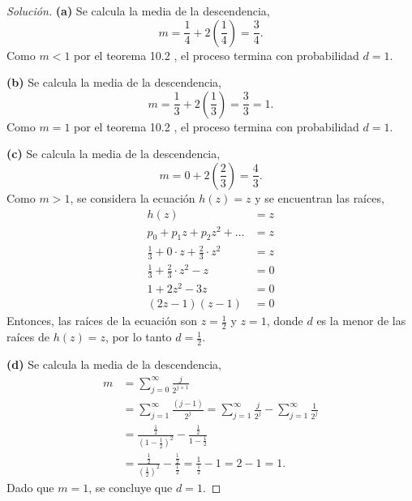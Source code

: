 \documentclass[12pt,letterpaper]{article}
\begin{document}
\begin{proof}[Solución]

\textbf{(a)} Se calcula la media de la descendencia, 
\begin{equation}
m= \frac{1}{4} + 2\left(\frac{1}{4}\right) = \frac{3}{4}.
\end{equation}
Como $m<1$ por el teorema 10.2 \cite{snell}, el proceso termina con probabilidad $d=1$.

\textbf{(b)} Se calcula la media de la descendencia, 
\begin{equation}
m= \frac{1}{3} + 2\left(\frac{1}{3}\right) = \frac{3}{3} = 1.
\end{equation}
Como $m=1$ por el teorema 10.2 \cite{snell}, el proceso termina con probabilidad $d=1$.

\textbf{(c)} Se calcula la media de la descendencia, 
\begin{equation}
m= 0 + 2\left(\frac{2}{3}\right) = \frac{4}{3}.
\end{equation}
Como $m>1$, se considera la ecuación $h(z) = z$ y se encuentran las raíces,
\begin{align}
h(z) &= z \\
p_0 + p_1 z + p_2 z^2 + \ldots &= z \\
\frac{1}{3} + 0\cdot z + \frac{2}{3} \cdot z^2 &= z \\
\frac{1}{3} + \frac{2}{3} \cdot z^2 - z &= 0\\
1 + 2z^2 -3z &=0 \\
(2z -1)(z - 1) &=0
\end{align}
Entonces, las raíces de la ecuación son $z=\frac{1}{2}$ y $z=1$, donde $d$ es la menor de las raíces de $h(z)=z$, por lo tanto $d=\frac{1}{2}$.

\textbf{(d)} Se calcula la media de la descendencia, 
\begin{align}
m &= \sum_{j=0}^{\infty} \frac{j}{2^{j+1}} \\
&= \sum_{j=1}^{\infty} \frac{(j-1)}{2^j} =  \sum_{j=1}^{\infty} \frac{j}{2^j} - \sum_{j=1}^{\infty} \frac{1}{2^j} \\
&= \frac{\frac{1}{2}}{\left(1 - \frac{1}{2}\right)^2} - \frac{\frac{1}{2}}{1-\frac{1}{2}} \\
&= \frac{\frac{1}{2}}{\left(\frac{1}{2}\right)^2} - \frac{\frac{1}{2}}{\frac{1}{2}} = \frac{1}{\frac{1}{2}} - 1 = 2 - 1 = 1.
\end{align}
Dado que $m=1$, se concluye que $d=1.$


\end{proof}
\end{document}
